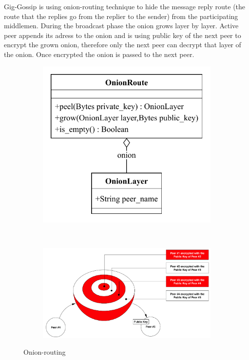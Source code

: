 \documentclass{article}
\begin{document}
Gig-Gossip is using onion-routing technique to hide the message reply route (the route that the replies go from the replier to the sender) from the participating middlemen. During the broadcast phase the onion grows layer by layer. Active peer appends its adress to the onion and is using public key of the next peer to encrypt the grown onion, therefore only the next peer can decrypt that layer of the onion. Once encrypted the onion is passed to the next peer.

\begin{figure}[t!]
    \centering 
    \begin{subfigure}[t]{0.3\textwidth}
		\centering
		\includegraphics[scale=0.7]{OnionRoute.pdf}
	\end{subfigure}%
    ~ 
    \begin{subfigure}[t]{0.7\textwidth}
		\centering
		\includegraphics[scale=0.35]{onion.pdf}
	\end{subfigure}
    \caption{Onion-routing}
	\label{fig:fr:onionrouting}
\end{figure}
\end{document}
